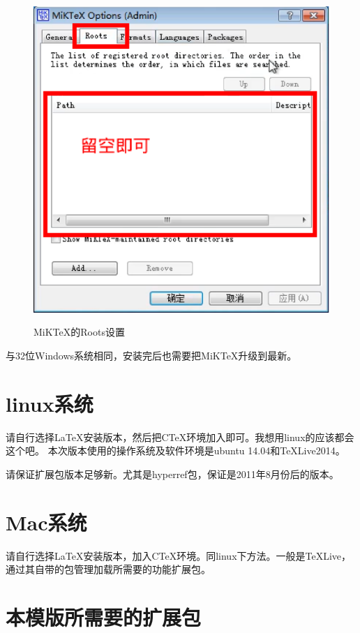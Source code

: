 \begin{figure}[th]
	\centering
	\includegraphics[scale=0.5]{./Pictures/Roots.eps}\\
	\caption{MiKTeX的Roots设置}
	\label{Roots}
\end{figure}

与32位Windows系统相同，安装完后也需要把MiKTeX升级到最新。

\section{linux系统}

请自行选择\LaTeX 安装版本，然后把CTeX环境加入即可。我想用linux的应该都会这个吧。
本次版本使用的操作系统及软件环境是ubuntu 14.04和TeXLive2014。

请保证扩展包版本足够新。尤其是hyperref包，保证是2011年8月份后的版本。

\section{Mac系统}

请自行选择\LaTeX 安装版本，加入CTeX环境。同linux下方法。一般是TeXLive，
通过其自带的包管理加载所需要的功能扩展包。

\section{本模版所需要的扩展包}

